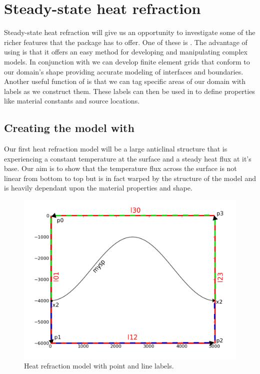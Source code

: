 
%
%
%

\section{Steady-state heat refraction}
Steady-state heat refraction will give us an opportunity to investigate some of the richer features that the \esc package has to offer. One of these is \pycad . The advantage of using \pycad is that it offers an easy method for developing and manipulating complex models. In conjunction with \gmsh we can develop finite element grids that conform to our domain's shape providing accurate modeling of interfaces and boundaries. Another useful function of \pycad is that we can tag specific areas of our domain with labels as we construct them. These labels can then be used in \esc to define properties like material constants and source locations. 

\subsection{Creating the model with \pycad}

Our first heat refraction model will be a large anticlinal structure that is experiencing a constant temperature at the surface and a steady heat flux at it's base. Our aim is to show that the temperature flux across the surface is not linear from bottom to top but is in fact warped by the structure of the model and is heavily dependant upon the material properties and shape.

\begin{figure}[h!]
\centerline{\includegraphics[width=4.in]{figures/anticlineheatrefraction}}
\caption{Heat refraction model with point and line labels.}
\label{fig:anticlinehrmodel}
\end{figure}

